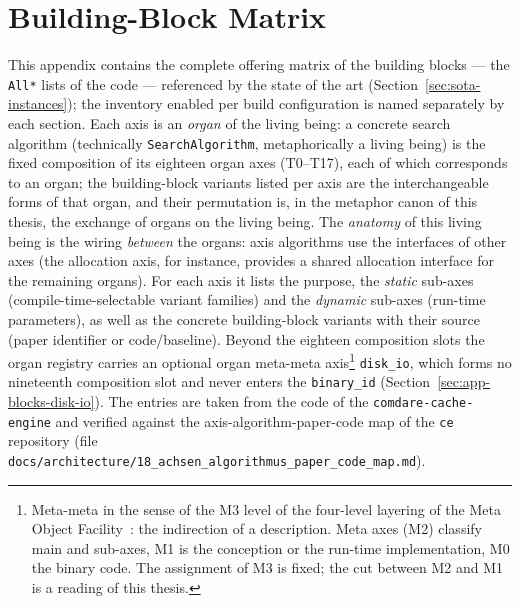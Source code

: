 \chapter{Building-Block Matrix}\label{app:blocks}

This appendix contains the complete offering matrix of the building blocks --- the \texttt{All*} lists of the code --- referenced by the state of the art
(Section~\ref{sec:sota-instances}); the inventory enabled per build configuration is named separately by each section. Each axis is an \emph{organ} of the living being: a concrete search algorithm (technically \texttt{SearchAlgorithm}, metaphorically a living being) is the fixed composition of its eighteen organ axes (T0--T17), each of which corresponds to an organ; the building-block variants listed per axis are the interchangeable forms of that organ, and their permutation is, in the metaphor canon of this thesis, the exchange of organs on the living being. The \emph{anatomy} of this living being is the wiring \emph{between} the organs: axis algorithms use the interfaces of other axes (the allocation axis, for instance, provides a shared allocation interface for the remaining organs). For each axis it lists the purpose, the \emph{static} sub-axes
(compile-time-selectable variant families) and the \emph{dynamic} sub-axes
(run-time parameters), as well as the concrete building-block variants with their source (paper identifier or
code/baseline). Beyond the eighteen composition slots the organ registry carries an optional organ meta-meta axis\footnote{Meta-meta in the sense of the M3 level of the four-level layering of the Meta Object Facility~\cite{omg2016mof}: the indirection of a description. Meta axes (M2) classify main and sub-axes, M1 is the conception or the run-time implementation, M0 the binary code. The assignment of M3 is fixed; the cut between M2 and M1 is a reading of this thesis.} \texttt{disk\_\allowbreak{}io}, which forms no nineteenth composition slot and never enters the \texttt{binary\_\allowbreak{}id} (Section~\ref{sec:app-blocks-disk-io}). The entries are taken from the code of the \texttt{comdare-cache-engine} and verified against
the axis-algorithm-paper-code map of the \texttt{ce} repository (file \texttt{docs/\allowbreak{}architecture/\allowbreak{}18\_\allowbreak{}achsen\_\allowbreak{}algorithmus\_\allowbreak{}paper\_\allowbreak{}code\_\allowbreak{}map.md}).

